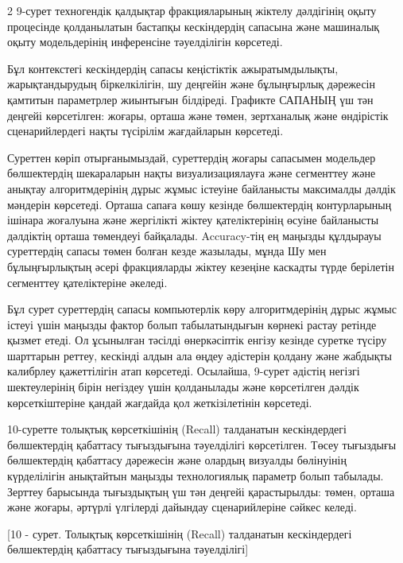 \begin{multicols}{2}
9-сурет техногендік қалдықтар фракцияларының жіктелу дәлдігінің оқыту
процесінде қолданылатын бастапқы кескіндердің сапасына және машиналық
оқыту модельдерінің инференсіне тәуелділігін көрсетеді.

Бұл контекстегі кескіндердің сапасы кеңістіктік ажыратымдылықты,
жарықтандырудың біркелкілігін, шу деңгейін және бұлыңғырлық дәрежесін
қамтитын параметрлер жиынтығын білдіреді. Графикте САПАНЫҢ үш тән
деңгейі көрсетілген: жоғары, орташа және төмен, зертханалық және
өндірістік сценарийлердегі нақты түсірілім жағдайларын көрсетеді.

Суреттен көріп отырғанымыздай, суреттердің жоғары сапасымен модельдер
бөлшектердің шекараларын нақты визуализациялауға және сегменттеу және
анықтау алгоритмдерінің дұрыс жұмыс істеуіне байланысты максималды
дәлдік мәндерін көрсетеді. Орташа сапаға көшу кезінде бөлшектердің
контурларының ішінара жоғалуына және жергілікті жіктеу қателіктерінің
өсуіне байланысты дәлдіктің орташа төмендеуі байқалады. Accuracy-тің ең
маңызды құлдырауы суреттердің сапасы төмен болған кезде жазылады, мұнда
Шу мен бұлыңғырлықтың әсері фракцияларды жіктеу кезеңіне каскадты түрде
берілетін сегменттеу қателіктеріне әкеледі.

Бұл сурет суреттердің сапасы компьютерлік көру алгоритмдерінің дұрыс
жұмыс істеуі үшін маңызды фактор болып табылатындығын көрнекі растау
ретінде қызмет етеді. Ол ұсынылған тәсілді өнеркәсіптік енгізу кезінде
суретке түсіру шарттарын реттеу, кескінді алдын ала өңдеу әдістерін
қолдану және жабдықты калибрлеу қажеттілігін атап көрсетеді. Осылайша,
9-сурет әдістің негізгі шектеулерінің бірін негіздеу үшін қолданылады
және көрсетілген дәлдік көрсеткіштеріне қандай жағдайда қол
жеткізілетінін көрсетеді.

10-суретте толықтық көрсеткішінің (Recall) талданатын кескіндердегі
бөлшектердің қабаттасу тығыздығына тәуелділігі көрсетілген. Төсеу
тығыздығы бөлшектердің қабаттасу дәрежесін және олардың визуалды
бөлінуінің күрделілігін анықтайтын маңызды технологиялық параметр болып
табылады. Зерттеу барысында тығыздықтың үш тән деңгейі қарастырылды:
төмен, орташа және жоғары, әртүрлі үлгілерді дайындау сценарийлеріне
сәйкес келеді.
\end{multicols}

[10 - сурет. Толықтық көрсеткішінің (Recall) талданатын
кескіндердегі бөлшектердің қабаттасу тығыздығына тәуелділігі]


